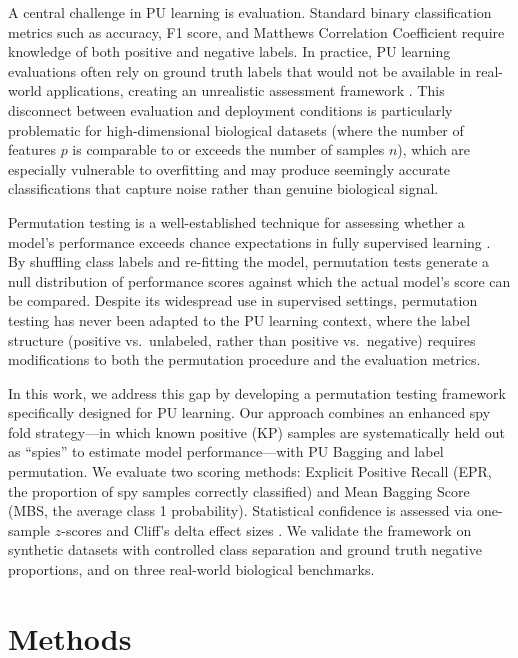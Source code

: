 \documentclass[12pt]{article}
\begin{document}
A central challenge in PU learning is evaluation. Standard binary classification metrics such as accuracy, F1 score, and Matthews Correlation Coefficient require knowledge of both positive and negative labels. In practice, PU learning evaluations often rely on ground truth labels that would not be available in real-world applications, creating an unrealistic assessment framework \citep{bekker2020learning}. This disconnect between evaluation and deployment conditions is particularly problematic for high-dimensional biological datasets (where the number of features $p$ is comparable to or exceeds the number of samples $n$), which are especially vulnerable to overfitting and may produce seemingly accurate classifications that capture noise rather than genuine biological signal.

Permutation testing is a well-established technique for assessing whether a model's performance exceeds chance expectations in fully supervised learning \citep{ojala2010permutation, good2005permutation}. By shuffling class labels and re-fitting the model, permutation tests generate a null distribution of performance scores against which the actual model's score can be compared. Despite its widespread use in supervised settings, permutation testing has never been adapted to the PU learning context, where the label structure (positive vs.\ unlabeled, rather than positive vs.\ negative) requires modifications to both the permutation procedure and the evaluation metrics.

In this work, we address this gap by developing a permutation testing framework specifically designed for PU learning. Our approach combines an enhanced spy fold strategy---in which known positive (KP) samples are systematically held out as ``spies'' to estimate model performance---with PU Bagging \citep{mordelet2014bagging} and label permutation. We evaluate two scoring methods: Explicit Positive Recall (EPR, the proportion of spy samples correctly classified) and Mean Bagging Score (MBS, the average class 1 probability). Statistical confidence is assessed via one-sample $z$-scores and Cliff's delta effect sizes \citep{cliff1993dominance}. We validate the framework on synthetic datasets with controlled class separation and ground truth negative proportions, and on three real-world biological benchmarks.

\section{Methods}
\end{document}
